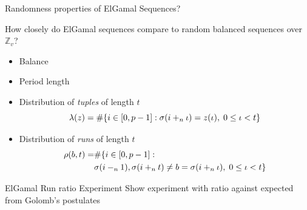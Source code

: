 \begin{frame}{Randomness properties of ElGamal Sequences?}
    
    \begin{center}
        How closely do ElGamal sequences compare to random balanced sequences over $\mathbb{Z}_v$?
    \end{center}
    
    \begin{itemize}
        \item Balance
        \item Period length
        \item Distribution of \emph{tuples} of length $t$  
        $$\lambda(z) = \#{\{i \in [0,p-1]: \sigma(i+_{n} \iota) = z(\iota),\; 0 \leq \iota < t\}}$$
        \item  Distribution of \emph{runs} of length $t$
        \begin{align*}
            \rho(b,t) = & \#{ \{i \in [0,p-1]: }\\
                        &\sigma(i-_{n} 1),\sigma(i+_n t) \neq b = \sigma(i+_n\iota),\; 0 \leq \iota < t\}
        \end{align*}
    \end{itemize}
  
  \end{frame}


  

  





  


\begin{frame}{ElGamal Run ratio Experiment}
    Show experiment with ratio against expected from Golomb's postulates
\end{frame}



 	

